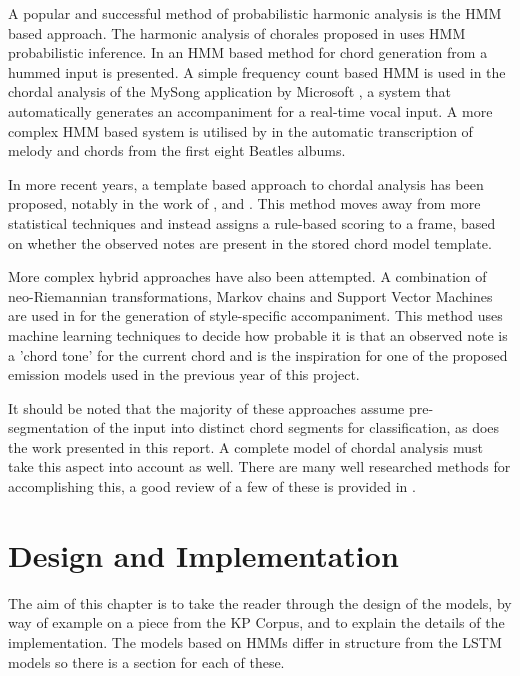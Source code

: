\documentclass[bsc,singlespacing,logo, parskip, deptreport]{infthesis}
\begin{document}
A popular and successful method of probabilistic harmonic analysis is the HMM based approach. The harmonic analysis of chorales proposed in \cite{allan2005harmonising} uses HMM probabilistic inference. In \cite{lee2004ring} an HMM based method for chord generation from a hummed input is presented. A simple frequency count based HMM is used in the chordal analysis of the MySong application by Microsoft \cite[]{mysong}, a system that automatically generates an accompaniment for a real-time vocal input. A more complex HMM based system is utilised by \cite{ryynanen2008automatic} in the automatic transcription of melody and chords from the first eight Beatles albums.

In more recent years, a template based approach to chordal analysis has been proposed, notably in the work of \cite{pardo2002algorithms}, \cite{oudre2009template} and \cite{oudre2011probabilistic}. This method moves away from more statistical techniques and instead assigns a rule-based scoring to a frame, based on whether the observed notes are present in the stored chord model template.

More complex hybrid approaches have also been attempted. A combination of neo-Riemannian transformations, Markov chains and Support Vector Machines are used in \cite{chuan2007hybrid} for the generation of style-specific accompaniment. This method uses machine learning techniques to decide how probable it is that an observed note is a 'chord tone' for the current chord and is the inspiration for one of the proposed emission models used in the previous year of this project.

It should be noted that the majority of these approaches assume pre-segmentation of the input into distinct chord segments for classification, as does the work presented in this report. A complete model of chordal analysis must take this aspect into account as well. There are many well researched methods for accomplishing this, a good review of a few of these is provided in \cite{pardo2002algorithms}.

\chapter{Design and Implementation}
The aim of this chapter is to take the reader through the design of the models, by way of example on a piece from the KP Corpus, and to explain the details of the implementation. The models based on HMMs differ in structure from the LSTM models so there is a section for each of these.
\end{document}
